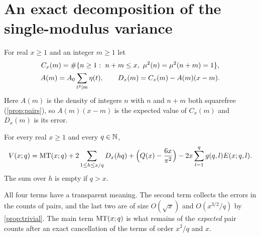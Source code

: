 \section{An exact decomposition of the single-modulus variance}\label{sec:identity}

For real $x\ge1$ and an integer $m\ge1$ let
\begin{gather}\label{eq:pairs-def}
C_x(m)=\#\{n\ge1:\ n+m\le x,\ \mu^2(n)=\mu^2(n+m)=1\},\\
A(m)=A_0\sum_{t^2\mid m}\eta(t),\qquad D_x(m)=C_x(m)-A(m)(x-m).\notag
\end{gather}
Here $A(m)$ is the density of integers $n$ with $n$ and $n+m$ both squarefree (\cref{prop:pairs}), so $A(m)(x-m)$ is the expected value of $C_x(m)$ and $D_x(m)$ is its error.

\begin{proposition}\label{prop:identity}
For every real $x\ge1$ and every $q\in\mathbb{N}$,
\[
V(x;q)=\mathrm{MT}(x;q)+2\sum_{1\le h\le x/q}D_x(hq)+\Bigl(Q(x)-\frac{6x}{\pi^2}\Bigr)-2x\sum_{l=1}^qg(q,l)E(x;q,l).
\]
The sum over $h$ is empty if $q>x$.
\end{proposition}

All four terms have a transparent meaning. The second term collects the errors in the counts of pairs, and the last two are of size $O(\sqrt x)$ and $O(x^{3/2}/q)$ by \cref{prop:trivial}. The main term $\mathrm{MT}(x;q)$ is what remains of the \emph{expected} pair counts after an exact cancellation of the terms of order $x^2/q$ and $x$.

